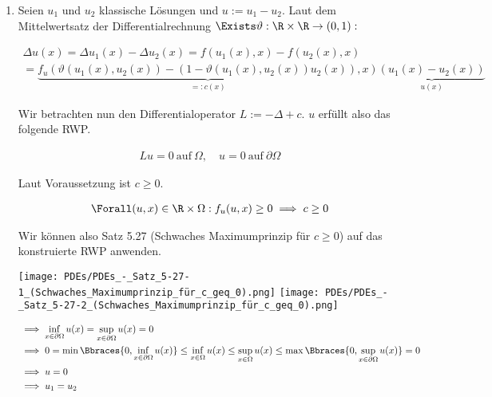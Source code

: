 \begin{solution}

\phantom{}

\begin{enumerate}[label = (\alph*)]

  \item Seien $u_1$ und $u_2$ klassische Lösungen und $u := u_1 - u_2$.
  Laut dem Mittelwertsatz der Differentialrechnung $\Exists \vartheta: \R \times \R \to (0, 1):$

  \begin{multline*}
    \Delta u(x)
    =
    \Delta u_1(x) - \Delta u_2(x)
    =
    f(u_1(x), x) - f(u_2(x), x) \\
    =
    \underbrace
    {
      f_u(\vartheta(u_1(x), u_2(x)) - (1 - \vartheta (u_1(x), u_2(x)) u_2(x)), x)
    }_{
      =: c(x)
    }
    \underbrace
    {
      (u_1(x) - u_2(x))
    }_{
      u(x)
    }
  \end{multline*}

  Wir betrachten nun den Differentialoperator $L := -\Delta + c$.
  $u$ erfüllt also das folgende RWP.

  \begin{align*}
    Lu = 0 ~\text{auf}~ \Omega,
    \quad
    u = 0 ~\text{auf}~ \partial \Omega
  \end{align*}

  Laut Voraussetzung ist $c \geq 0$.

  \begin{align*}
    \Forall (u, x) \in \R \times \Omega:
    f_u(u, x) \geq 0
    \implies
    c \geq 0
  \end{align*}

  Wir können also Satz 5.27 (Schwaches Maximumprinzip für $c \geq 0$) auf das konstruierte RWP anwenden.


  \begin{center}
    \texttt{[image: PDEs/PDEs\_-\_Satz\_5-27-1\_(Schwaches\_Maximumprinzip\_für\_c\_geq\_0).png]}
    \texttt{[image: PDEs/PDEs\_-\_Satz\_5-27-2\_(Schwaches\_Maximumprinzip\_für\_c\_geq\_0).png]}
  \end{center}

  \begin{align*}
    & \implies
    \inf_{x \in \partial \Omega} u(x)
    =
    \sup_{x \in \partial \Omega} u(x)
    =
    0 \\
    & \implies
    0
    =
    \min \Bbraces{0, \inf_{x \in \partial \Omega} u(x)}
    \leq
    \inf_{x \in \Omega} u(x)
    \leq
    \sup_{x \in \Omega} u(x)
    \leq
    \max \Bbraces{0, \sup_{x \in \partial \Omega} u(x)}
    =
    0 \\
    & \implies
    u = 0 \\
    & \implies
    u_1 = u_2
  \end{align*}


\end{enumerate}
\end{solution}
